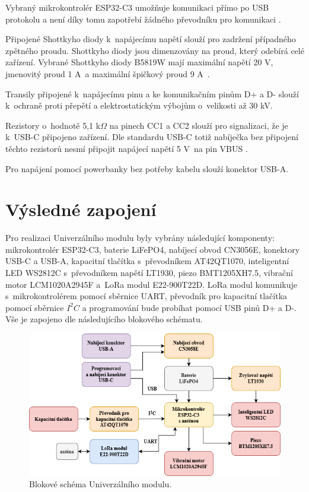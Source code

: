 Vybraný mikrokontrolér ESP32-C3 umožňuje komunikaci přímo po USB protokolu a není díky tomu zapotřebí žádného převodníku pro komunikaci \cite{ESP_C3_dtsh}.

Připojené Shottkyho diody k~napájecímu napětí slouží pro zadržení případného zpětného proudu. Shottkyho diody jsou dimenzovány na proud, který odebírá celé zařízení. Vybrané 
Shottkyho diody  B5819W mají maximální napětí 20 V, jmenovitý proud 1 A~a maximální špičkový proud 9 A~\cite{shotky_dtsh}.

Transily připojené k~napájecímu pinu a ke komunikačním pinům D+ a D- slouží k~ochraně proti přepětí a elektrostatickým výbojům o~velikosti až 30 kV. 

Rezistory o~hodnotě 5,1 k$\Omega$ na pinech CC1 a CC2 slouží pro signalizaci, že je k~USB-C připojeno zařízení. Dle standardu USB-C totiž nabíječka bez 
připojení těchto rezistorů nesmí připojit napájecí napětí 5 V~na pin VBUS \cite{USB-C}. 

Pro napájení pomocí powerbanky bez potřeby kabelu slouží konektor USB-A. 

\newpage
\section{Výsledné zapojení}
Pro realizaci Univerzálního modulu byly vybrány následující komponenty: mikrokontrolér ESP32-C3, baterie LiFePO4, nabíjecí obvod CN3056E, konektory USB-C a USB-A,
kapacitní tlačítka s~převodníkem AT42QT1070, inteligentní LED WS2812C s~převodníkem napětí LT1930, piezo BMT1205XH7.5, vibrační motor LCM1020A2945F a~LoRa modul 
E22-900T22D. LoRa modul komunikuje 
s~mikrokontrolérem pomocí sběrnice UART, převodník pro kapacitní tlačítka pomocí sběrnice $I^2C$ a programování bude probíhat pomocí USB pinů D+ a D-. Vše je 
zapojeno dle následujícího blokového schématu. 

\begin{figure}[!h]
  \begin{center}
    \includegraphics[scale=0.65]{obrazky/vysledne_blokove_schema.png}
  \end{center}
  \caption[Blokové schéma Univerzálního modulu]{Blokové schéma Univerzálního modulu.}
\end{figure}


